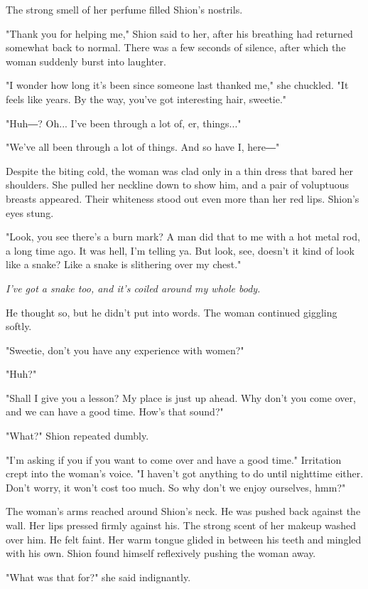 The strong smell of her perfume filled Shion's nostrils.

"Thank you for helping me," Shion said to her, after his breathing had
returned somewhat back to normal. There was a few seconds of silence,
after which the woman suddenly burst into laughter.

"I wonder how long it's been since someone last thanked me," she
chuckled. "It feels like years. By the way, you've got interesting hair,
sweetie."

"Huh―? Oh... I've been through a lot of, er, things..."

"We've all been through a lot of things. And so have I, here―"

Despite the biting cold, the woman was clad only in a thin dress that
bared her shoulders. She pulled her neckline down to show him, and a
pair of voluptuous breasts appeared. Their whiteness stood out even more
than her red lips. Shion's eyes stung.

"Look, you see there's a burn mark? A man did that to me with a hot
metal rod, a long time ago. It was hell, I'm telling ya. But look, see,
doesn't it kind of look like a snake? Like a snake is slithering over my
chest."

\emph{I've got a snake too, and it's coiled around my whole body.}

He thought so, but he didn't put into words. The woman continued
giggling softly.

"Sweetie, don't you have any experience with women?"

"Huh?"

"Shall I give you a lesson? My place is just up ahead. Why don't you
come over, and we can have a good time. How's that sound?"

"What?" Shion repeated dumbly.

"I'm asking if you if you want to come over and have a good time."
Irritation crept into the woman's voice. "I haven't got anything to do
until nighttime either. Don't worry, it won't cost too much. So why
don't we enjoy ourselves, hmm?"

The woman's arms reached around Shion's neck. He was pushed back against
the wall. Her lips pressed firmly against his. The strong scent of her
makeup washed over him. He felt faint. Her warm tongue glided in between
his teeth and mingled with his own. Shion found himself reflexively
pushing the woman away.

"What was that for?" she said indignantly.


